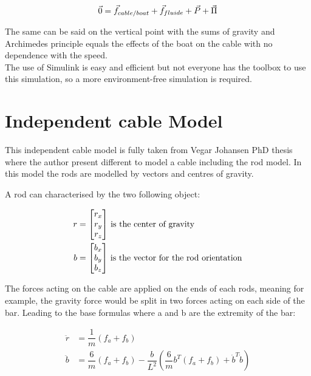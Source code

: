 \begin{equation}
 \vec{0} = \vec{f}_{cable/boat}+\vec{f}_{fluide}+\vec{P}+\vec{\Pi}\\
 \label{equ_Stab}
\end{equation}

The same can be said on the vertical point with the sums of gravity and Archimedes principle equals the effects of the boat on the cable with no dependence with the speed.\\

The use of Simulink is easy and efficient but not everyone has the toolbox to use this simulation, so a more 
environment-free simulation is required.
\section{Independent cable Model}

This independent cable model is fully taken from  Vegar Johansen PhD thesis~\cite{johansen2007modelling} where the author present different to model a cable including the rod model. In this model the rods are modelled by vectors and centres of gravity.

A rod can characterised by the two following object:

\begin{align}
r &= \begin{bmatrix}
    r_x \\
    r_y \\
    r_z
\end{bmatrix}\, \textnormal{is the center of gravity}\\
b &= \begin{bmatrix}
    b_x \\
    b_y \\
    b_z
\end{bmatrix}\, \textnormal{is the vector for the rod orientation}
\end{align}

The forces acting on the cable are applied on the ends of each rods, meaning for example, the gravity force would be split in two forces acting on each side of the bar. Leading to the base formulas where a and b are the extremity of the bar:

\begin{align}
\ddot{r} &= \dfrac{1}{m}  (f_a+f_b) \\
\ddot{b} &=  \dfrac{6}{m}(f_a+f_b) - \dfrac{b}{L^{2}}  (\dfrac{6}{m}b^{T}(f_a+f_b)+\dot{b}^{T}\dot{b}) 
\end{align}

